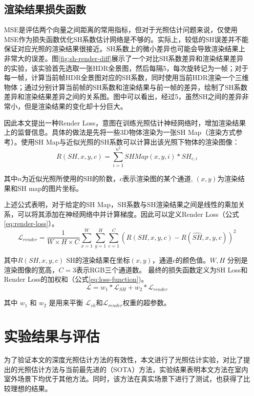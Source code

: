 \subsection{渲染结果损失函数} MSE是评估两个向量之间距离的常用指标，但对于光照估计问题来说，仅使用MSE作为损失函数优化SH系数估计网络是不够的。实际上，较低的SH误差并不能保证对应光照的渲染结果很接近。SH系数上的微小差异也可能会导致渲染结果上非常大的误差。图\ref{fig:sh-render-diff}展示了一个对比SH系数差异和渲染结果差异的实验，该实验首先选取一张HDR全景图，然后每隔5，每次旋转记为一帧；对于每一帧，计算当前帧HDR全景图对应的SH系数，同时使用当前HDR渲染一个三维物体；通过分别计算当前帧的SH系数和渲染结果与前一帧的差异，绘制了SH系数差异和渲染结果差异之间的关系图。图中可以看出，经过5，虽然SH之间的差异非常小，但是渲染结果的变化却十分巨大。



因此本文提出一种Render Loss，意图在训练光照估计神经网络时，增加渲染结果上的监督信息。具体的做法是先将一些3D物体渲染为一张SH Map（渲染方式参考\cite{green2003spherical}）。使用SH Map与近似光照的SH系数可以计算出该光照下物体的渲染图像：
\begin{equation}
    R(SH, x, y, c) = \sum^{n^2}_{i=1}SHMap(x,y,i)*SH_{c,i}
\end{equation}

其中$n$为近似光照所使用的SH的阶数，$c$表示渲染图的某个通道, $(x, y)$为渲染结果和SH map的图片坐标。

上述公式表明，对于给定的SH Map，SH系数与SH渲染结果之间是线性的乘加关系，可以将其添加在神经网络中并计算梯度。因此可以定义Render Loss（公式\ref{eq:render-loss}）。
\begin{equation}
    \label{eq:render-loss}
    \mathcal{L}_{render} = \frac{1}{W\times H\times C} \sum_{x=1}^{W}\sum_{y=1}^{H}\sum_{c=1}^{C}(R(SH,x,y,c)-R(\hat{SH},x,y,c))^{2}
\end{equation}

其中$R(SH,x,y,c)$ SH的渲染结果在坐标$(x,y)$，通道$c$的颜色值。$W, H$ 分别是渲染图像的宽高，$C=3$表示RGB三个通道数。
最终的损失函数定义为SH Loss和Render Loss的加权和（公式\ref{eq:loss-function})。
\begin{equation}
    \label{eq:loss-function}
    \mathcal{L} =w_{1}*\mathcal{L}_{SH}+w_{2}*\mathcal{L}_{render}
\end{equation}

 其中 $w_1$ 和 $w_2$ 是用来平衡 $\mathcal{L}_{sh}$和$\mathcal{L}_{render}$权重的超参数。
\section{实验结果与评估}\label{sec:experiment}
为了验证本文的深度光照估计方法的有效性，本文进行了光照估计实验，对比了提出的光照估计方法与当前最先进的（SOTA）方法，实验结果表明本文方法在室内室外场景下均优于其他方法。同时，该方法在真实场景下进行了测试，也获得了比较理想的结果。
